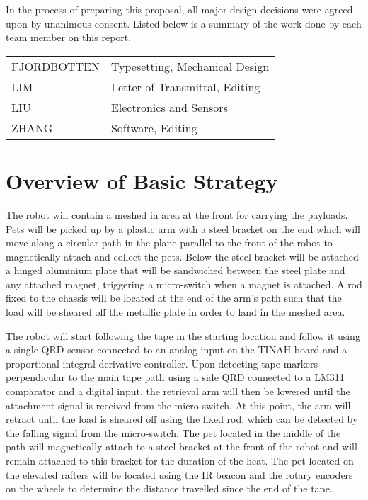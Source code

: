 \documentclass[11pt, oneside]{article} %
\begin{document}
In the process of preparing this proposal, all major design decisions were agreed upon by unanimous consent. Listed below is a summary of the work done by each team member on this report.

\begin{center}
	\begin{tabular}{ l l }
		FJORDBOTTEN & Typesetting, Mechanical Design \\
		LIM & Letter of Transmittal, Editing \\
		LIU & Electronics and Sensors \\
		ZHANG & Software, Editing \\
	\end{tabular}
\end{center}

\section{Overview of Basic Strategy}

The robot will contain a meshed in area at the front for carrying the payloads. Pets will be picked up by a plastic arm with a steel bracket on the end which will move along a circular path in the plane parallel to the front of the robot to magnetically attach and collect the pets. Below the steel bracket will be attached a hinged aluminium plate that will be sandwiched between the steel plate and any attached magnet, triggering a micro-switch when a magnet is attached. A rod fixed to the chassis will be located at the end of the arm's path such that the load will be sheared off the metallic plate in order to land in the meshed area.

The robot will start following the tape in the starting location and follow it using a single QRD sensor connected to an analog input on the TINAH board and a proportional-integral-derivative controller. Upon detecting tape markers perpendicular to the main tape path using a side QRD connected to a LM311 comparator and a digital input, the retrieval arm will then be lowered until the attachment signal is received from the micro-switch. At this point, the arm will retract until the load is sheared off using the fixed rod, which can be detected by the falling signal from the micro-switch. The pet located in the middle of the path will magnetically attach to a steel bracket at the front of the robot and will remain attached to this bracket for the duration of the heat. The pet located on the elevated rafters will be located using the IR beacon and the rotary encoders on the wheels to determine the distance travelled since the end of the tape.
\end{document}
